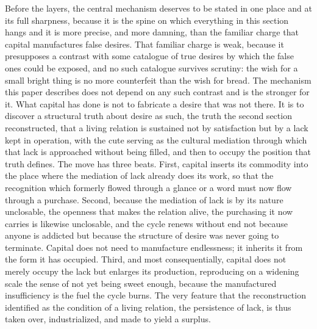 \documentclass[11pt,a4paper]{article}
\begin{document}
Before the layers, the central mechanism deserves to be stated in one place and at its full sharpness, because it is the spine on which everything in this section hangs and it is more precise, and more damning, than the familiar charge that capital manufactures false desires. That familiar charge is weak, because it presupposes a contrast with some catalogue of true desires by which the false ones could be exposed, and no such catalogue survives scrutiny: the wish for a small bright thing is no more counterfeit than the wish for bread. The mechanism this paper describes does not depend on any such contrast and is the stronger for it. What capital has done is not to fabricate a desire that was not there. It is to discover a structural truth about desire as such, the truth the second section reconstructed, that a living relation is sustained not by satisfaction but by a lack kept in operation, with the cute serving as the cultural mediation through which that lack is approached without being filled, and then to occupy the position that truth defines. The move has three beats. First, capital inserts its commodity into the place where the mediation of lack already does its work, so that the recognition which formerly flowed through a glance or a word must now flow through a purchase. Second, because the mediation of lack is by its nature unclosable, the openness that makes the relation alive, the purchasing it now carries is likewise unclosable, and the cycle renews without end not because anyone is addicted but because the structure of desire was never going to terminate. Capital does not need to manufacture endlessness; it inherits it from the form it has occupied. Third, and most consequentially, capital does not merely occupy the lack but enlarges its production, reproducing on a widening scale the sense of not yet being sweet enough, because the manufactured insufficiency is the fuel the cycle burns. The very feature that the reconstruction identified as the condition of a living relation, the persistence of lack, is thus taken over, industrialized, and made to yield a surplus.
\end{document}
